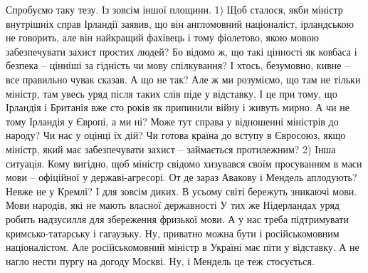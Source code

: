 Спробуємо таку тезу. Із зовсім іншої площини.
1) Щоб сталося, якби міністр внутрішніх справ Ірландії заявив, що він англомовний націоналіст, ірландською не говорить, але він найкращий фахівець і тому фіолетово, якою мовою забезпечувати захист простих людей? Бо відомо ж, що такі цінності як ковбаса і безпека – цінніші за гідність чи мову спілкування? 
І хтось, безумовно, кивне – все правильно чувак сказав. А що не так?
Але ж ми розуміємо, що там не тільки міністр, там увесь уряд після таких слів піде у відставку. І це при тому, що Ірландія і Британія вже сто років як припинили війну і живуть мирно.
А чи не тому Ірландія у Європі, а ми ні? Може тут справа у відношенні міністрів до народу? Чи нас у оцінці їх дій? Чи готова країна до вступу в Євросоюз, якщо міністр, який має забезпечувати захист – займається протилежним?
2) Інша ситуація. Кому вигідно, щоб міністр свідомо хизувався своїм просуванням в маси мови – офіційної у державі-агресорі.
От де зараз Авакову і Мендель аплодують? Невже не у Кремлі?
І для зовсім диких. В усьому світі бережуть зникаючі мови. Мови народів, які не мають власної державності
У тих же Нідерландах уряд робить надзусилля для збереження фризької мови. 
А у нас треба підтримувати кримсько-татарську і гагаузьку.
Ну, приватно можна бути і російськомовним націоналістом.
Але російськомовний міністр в Україні має піти у відставку.
А не нагло нести пургу на догоду Москві.
Ну, і Мендель це теж стосується.
